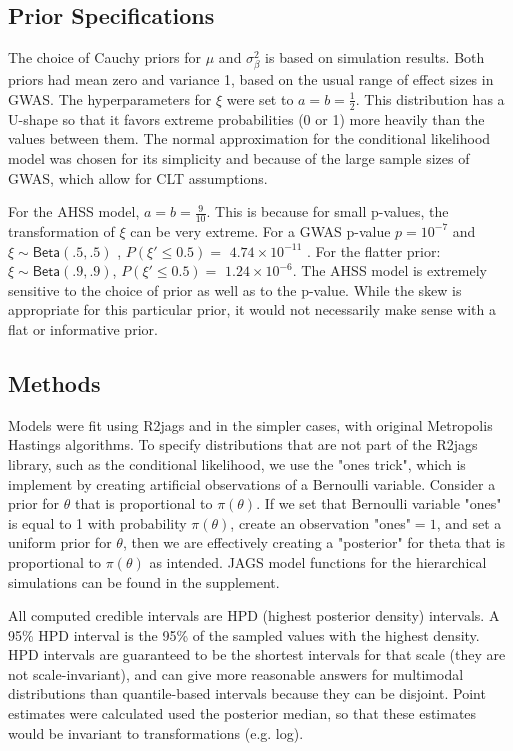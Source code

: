 \documentclass[AMA,STIX1COL]{WileyNJD-v2}\usepackage[]{graphicx}\usepackage[]{color}
\begin{document}
\subsection{Prior Specifications}


The choice of Cauchy priors for $\mu$ and $\sigma^2_{\beta}$ is based on simulation results. Both priors had mean zero and variance 1, based on the usual range of effect sizes in GWAS. The hyperparameters for $\xi$ were set to $a = b= \frac{1}{2}$. This distribution has a U-shape so that it favors extreme probabilities (0 or 1) more heavily than the values between them.  The normal approximation for the conditional likelihood model was chosen for its simplicity and because of the large sample sizes of GWAS, which allow for CLT assumptions.

For the AHSS model, $a = b= \frac{9}{10}$. This is because for small p-values, the transformation of $\xi$ can be very extreme. For a GWAS p-value $p = 10^{-7}$ and $\xi \sim \textsf{Beta}(.5,.5)$ , $P( \xi' \leq 0.5) =$  $\ensuremath{4.74\times 10^{-11}}$ . For the flatter prior: $\xi \sim \textsf{Beta}(.9,.9)$, $P( \xi' \leq 0.5) =$ $\ensuremath{1.24\times 10^{-6}}$. The AHSS model is extremely sensitive to the choice of prior as well as to the p-value. While the skew is appropriate for this particular prior, it would not necessarily make sense with a flat or informative prior.

\subsection{Methods}

Models were fit using R2jags and in the simpler cases, with original Metropolis Hastings algorithms. To specify distributions that are not part of the R2jags library, such as the conditional likelihood, we use the "ones trick", which is implement by creating artificial observations of a Bernoulli variable. Consider a prior for $\theta$ that is proportional to $\pi(\theta)$. If we set that Bernoulli variable "ones" is equal to 1 with probability $\pi(\theta)$, create an observation "ones"$= 1$, and set a uniform prior for $\theta$, then we are effectively creating a "posterior" for theta that is proportional to  $\pi(\theta)$ as intended. JAGS model functions for the hierarchical simulations can be found in the supplement.

All computed credible intervals are HPD (highest posterior density) intervals. A 95\% HPD interval is the 95\% of the sampled values with the highest density. HPD intervals are guaranteed to be the shortest intervals for that scale (they are not scale-invariant), and can give more reasonable answers for multimodal distributions than quantile-based intervals because they can be disjoint. Point estimates were calculated used the posterior median, so that these estimates would be invariant to transformations (e.g. log).
\end{document}
